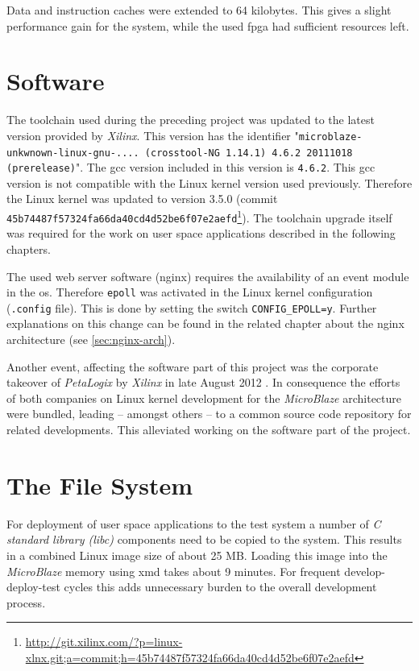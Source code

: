Data and instruction caches were extended to 64 kilobytes. This gives a slight performance gain for the system, while the used \gls{fpga} had sufficient resources left.
\\

\section{Software}

The toolchain used during the preceding project was updated to the latest version provided by \textit{Xilinx}. This version has the identifier "\texttt{microblaze-unkwnown-linux-gnu-.... (crosstool-NG 1.14.1) 4.6.2 20111018 (prerelease)}". The \gls{gcc} version included in this version is \texttt{4.6.2}. This \gls{gcc} version is not compatible with the Linux kernel version used previously. Therefore the Linux kernel was updated to version 3.5.0 (commit \texttt{45b74487f57324fa66da40cd4d52be6f07e2aefd}\footnote{\url{http://git.xilinx.com/?p=linux-xlnx.git;a=commit;h=45b74487f57324fa66da40cd4d52be6f07e2aefd}}). The toolchain upgrade itself was required for the work on user space applications described in the following chapters.

The used web server software (nginx) requires the availability of an event module in the \gls{os}. Therefore \texttt{epoll} was activated in the Linux kernel configuration (\texttt{.config} file). This is done by setting the switch \texttt{CONFIG\_EPOLL=y}. Further explanations on this change can be found in the related chapter about the nginx architecture (see \ref{sec:nginx-arch}).

Another event, affecting the software part of this project was the corporate takeover of \textit{PetaLogix} by \textit{Xilinx} in late August 2012 \cite{takeover}. In consequence the efforts of both companies on Linux kernel development for the \textit{MicroBlaze} architecture were bundled, leading -- amongst others -- to a common source code repository for related developments. This alleviated working on the software part of the project.
\\

\section{The File System}

For deployment of user space applications to the test system a number of \textit{C standard library (libc)} components need to be copied to the system. This results in a combined Linux image size of about 25 MB. Loading this image into the \textit{MicroBlaze} memory using \gls{xmd} takes about 9 minutes. For frequent develop-deploy-test cycles this adds unnecessary burden to the overall development process.

